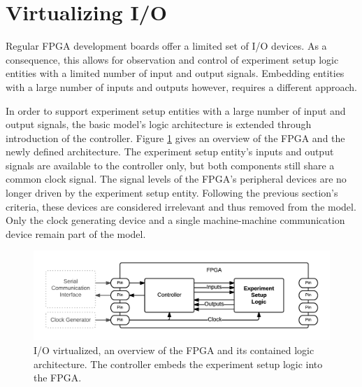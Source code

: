 \documentclass[openright]{template/uva-bachelor-thesis}
\begin{document}
\section{Virtualizing I/O}
\label{sectionvirtualizingio}




Regular FPGA development boards offer a limited set of I/O devices. As a consequence, this allows for observation and control of experiment setup logic entities with a limited number of input and output signals. Embedding entities with a large number of inputs and outputs however, requires a different approach. 

In order to support experiment setup entities with a large number of input and output signals, the basic model's logic architecture is extended through introduction of the controller. Figure \ref{fig:fpga-inout} gives an overview of the FPGA and the newly defined architecture. The experiment setup entity's inputs and output signals are available to the controller only, but both components still share a common clock signal. The signal levels of the FPGA's peripheral devices are no longer driven by the experiment setup entity. Following the previous section's criteria, these devices are considered irrelevant and thus removed from the model. Only the clock generating device and a single machine-machine communication device remain part of the model. 


\begin{figure}[h]
\centering
\includegraphics[width=\textwidth]{img/fpga-inout}
\caption{I/O virtualized, an overview of the FPGA and its contained logic architecture. The controller embeds the experiment setup logic into the FPGA.}
\label{fig:fpga-inout}
\end{figure}
\end{document}
